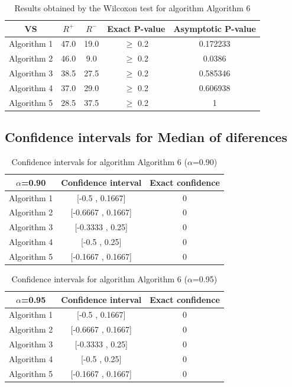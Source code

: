 \documentclass[a4paper,10pt]{article}
\begin{document}
\begin{table}[!htp]
\centering\small
\begin{tabular}{
|c|c|c|c|c|}
\hline
 VS & $R^{+}$ & $R^{-}$ & Exact P-value & Asymptotic P-value \\ \hline 
Algorithm 1 & 47.0 & 19.0 & $\geq$ 0.2 & 0.172233\\ \hline 
Algorithm 2 & 46.0 & 9.0 & $\geq$ 0.2 & 0.0386\\ \hline 
Algorithm 3 & 38.5 & 27.5 & $\geq$ 0.2 & 0.585346\\ \hline 
Algorithm 4 & 37.0 & 29.0 & $\geq$ 0.2 & 0.606938\\ \hline 
Algorithm 5 & 28.5 & 37.5 & $\geq$ 0.2 & 1\\ \hline 

\end{tabular}
\caption{Results obtained by the Wilcoxon test for algorithm Algorithm 6}
\end{table}

\subsection{Confidence intervals for Median of diferences}

\begin{table}[!htp]
\centering\small
\begin{tabular}{
|c|c|c|}
\hline
 $\alpha$=0.90 & Confidence interval & Exact confidence \\ \hline 
Algorithm 1 & [-0.5 , 0.1667] & 0\\ \hline 
Algorithm 2 & [-0.6667 , 0.1667] & 0\\ \hline 
Algorithm 3 & [-0.3333 , 0.25] & 0\\ \hline 
Algorithm 4 & [-0.5 , 0.25] & 0\\ \hline 
Algorithm 5 & [-0.1667 , 0.1667] & 0\\ \hline 

\end{tabular}
\caption{Confidence intervals for algorithm Algorithm 6 ($\alpha$=0.90)}
\end{table}
\begin{table}[!htp]
\centering\small
\begin{tabular}{
|c|c|c|}
\hline
 $\alpha$=0.95 & Confidence interval & Exact confidence \\ \hline 
Algorithm 1 & [-0.5 , 0.1667] & 0\\ \hline 
Algorithm 2 & [-0.6667 , 0.1667] & 0\\ \hline 
Algorithm 3 & [-0.3333 , 0.25] & 0\\ \hline 
Algorithm 4 & [-0.5 , 0.25] & 0\\ \hline 
Algorithm 5 & [-0.1667 , 0.1667] & 0\\ \hline 

\end{tabular}
\caption{Confidence intervals for algorithm Algorithm 6 ($\alpha$=0.95)}
\end{table}

 \clearpage 
\end{document}
